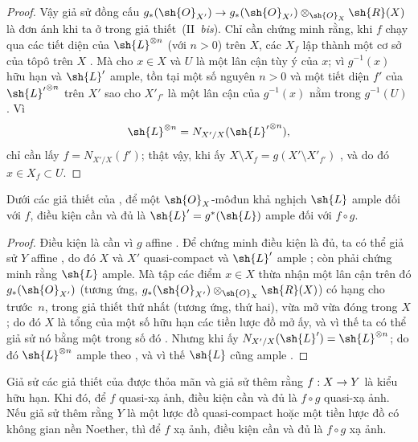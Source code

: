 \documentclass[oneside,10pt]{amsart}
\makeatletter
\newcommand{\ega@arrow}[2]{\mathchoice{#1}{#2}{#2}{#2}}
\renewcommand{\to}{\ega@arrow{\longrightarrow}{\rightarrow}}
\newcommand{\oldpage}[2][]{\marginnote{\normalfont\footnotesize\textbf{#1}~|~#2}\ignorespaces}
\let\EGAOriginalLabel\label
\renewcommand{\label}[1]{\phantomsection\EGAOriginalLabel{#1}}
\makeatother
\begin{document}
\begin{proof}
Vậy giả sử đồng cấu $g_*(\sh{O}_{X'})\to g_*(\sh{O}_{X'})\otimes_{\sh{O}_X}\sh{R}(X)$ là đơn ánh khi ta ở trong giả thiết~(II~\emph{bis}).
Chỉ cần chứng minh rằng, khi $f$ chạy qua các tiết diện của $\sh{L}^{\otimes n}$ (với $n>0$) trên $X$, các $X_f$ lập thành một cơ sở của tôpô trên $X$ .
Mà cho $x\in X$ và $U$ là một lân cận tùy ý của $x$;
vì $g^{-1}(x)$ hữu hạn  và $\sh{L}'$ ample, tồn tại một số nguyên $n>0$ và một tiết diện $f'$ của ${\sh{L}'}^{\otimes n}$ trên $X'$ sao cho $X'_{f'}$ là một lân cận của $g^{-1}(x)$ nằm trong $g^{-1}(U)$ .
Vì
\[
  \sh{L}^{\otimes n} = N_{X'/X}({\sh{L}'}^{\otimes n}),
\]
chỉ cần lấy $f=N_{X'/X}(f')$;
thật vậy, khi ấy $X\setminus X_f=g(X'\setminus X'_{f'})$ , và do đó $x\in X_f\subset U$.
\end{proof}

\begin{corollary}[6.6.3]
\label{II.6.6.3}
Dưới các giả thiết của , để một $\sh{O}_X$-môđun khả nghịch $\sh{L}$ ample đối với $f$, điều kiện cần và đủ là $\sh{L}'=g^*(\sh{L})$ ample đối với $f\circ g$.
\end{corollary}

\begin{proof}
Điều kiện là cần vì $g$ affine .
Để chứng minh điều kiện là đủ, ta có thể giả sử $Y$ affine , do đó $X$ và $X'$ quasi-compact và $\sh{L}'$ ample ; còn phải chứng minh rằng $\sh{L}$ ample. Mà tập các điểm
\oldpage[II]{132}
$x\in X$ thừa nhận một lân cận trên đó $g_*(\sh{O}_{X'})$ (tương ứng, $g_*(\sh{O}_{X'})\otimes_{\sh{O}_X}\sh{R}(X)$) có hạng cho trước~$n$, trong giả thiết thứ nhất (tương ứng, thứ hai), vừa mở vừa đóng trong $X$; do đó $X$ là tổng của một số hữu hạn các tiền lược đồ mở ấy, và vì thế ta có thể giả sử nó bằng một trong số đó .
Nhưng khi ấy $N_{X'/X}(\sh{L}')=\sh{L}^{\otimes n}$; do đó $\sh{L}^{\otimes n}$ ample theo , và vì thế $\sh{L}$ cũng ample .
\end{proof}

\begin{corollary}[6.6.4]
\label{II.6.6.4}
Giả sử các giả thiết của  được thỏa mãn và giả sử thêm rằng $f:X\to Y$ là kiểu hữu hạn.
Khi đó, để $f$ quasi-xạ ảnh, điều kiện cần và đủ là $f\circ g$ quasi-xạ ảnh.
Nếu giả sử thêm rằng $Y$ là một lược đồ quasi-compact hoặc một tiền lược đồ có không gian nền Noether, thì để $f$ xạ ảnh, điều kiện cần và đủ là $f\circ g$ xạ ảnh.
\end{corollary}
\end{document}
